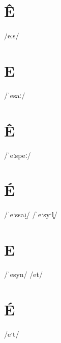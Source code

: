 \documentclass[10pt,a4paper,twoside]{book}
\begin{document}
\section*{Ê}

\begin{multicols}{3}
 {/eːs/} {}
\end{multicols}

\section*{E}

\begin{multicols}{3}
 {/ˈesaː/} {}
\end{multicols}

\section*{Ê}

\begin{multicols}{3}
 {/ˈeːspeː/} {}
\end{multicols}

\section*{É}

\begin{multicols}{3}
 {/ˈeˑssaɪ̯/} {}
 {/ˈeˑsyˑl̥/} {}
\end{multicols}

\section*{E}

\begin{multicols}{3}
 {/ˈesyn/} {}
 {/et/} {}
\end{multicols}

\section*{É}

\begin{multicols}{3}
 {/eˑt/} {}
\end{multicols}
\end{document}
